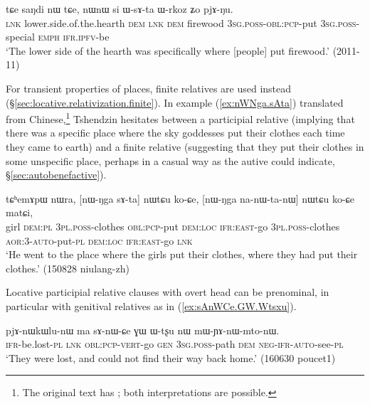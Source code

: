 \begin{exe}
\ex \label{ex:WsAta.Wrkoz}
\gll tɕe saŋdi nɯ tɕe, nɯnɯ si ɯ-sɤ-ta ɯ-rkoz ʑo pjɤ-ŋu. \\
  \textsc{lnk} lower.side.of.the.hearth \textsc{dem} \textsc{lnk} \textsc{dem} firewood \textsc{3sg}.\textsc{poss}-\textsc{obl}:\textsc{pcp}-put \textsc{3sg}.\textsc{poss}-special \textsc{emph} \textsc{ifr}.\textsc{ipfv}-be \\
\glt `The lower side of the hearth was specifically where [people] put firewood.' (2011-11)
\end{exe}


For transient properties of places, finite relatives are used instead (§\ref{sec:locative.relativization.finite}). In example (\ref{ex:nWNga.sAta}) translated from Chinese,\footnote{The original text has ; both interpretations are possible. }  Tshendzin hesitates between a participial relative (implying that there was a specific place where the sky goddesses put their clothes each time they came to earth) and a finite relative (suggesting that they put their clothes in some unspecific place, perhaps in a casual way as the autive  could indicate, §\ref{sec:autobenefactive}).

\begin{exe}
\ex \label{ex:nWNga.sAta}
\gll tɕʰemɤpɯ nɯra, [nɯ-ŋga sɤ-ta] nɯtɕu ko-ɕe, [nɯ-ŋga na-nɯ-ta-nɯ] nɯtɕu ko-ɕe matɕi, \\
girl \textsc{dem}:\textsc{pl} \textsc{3pl}.\textsc{poss}-clothes \textsc{obl}:\textsc{pcp}-put \textsc{dem}:\textsc{loc} \textsc{ifr}:\textsc{east}-go \textsc{3pl}.\textsc{poss}-clothes \textsc{aor}:3\flobv{}-\textsc{auto}-put-\textsc{pl} \textsc{dem}:\textsc{loc} \textsc{ifr}:\textsc{east}-go \textsc{lnk} \\
\glt `He went to the place where the girls put their clothes, where they had put their clothes.' (150828 niulang-zh) 
\end{exe}

Locative participial relative clauses with overt head can be prenominal, in particular with genitival relatives as in (\ref{ex:sAnWCe.GW.Wtsxu}). 

\begin{exe}
\ex \label{ex:sAnWCe.GW.Wtsxu}
\gll  pjɤ-nɯkɯlu-nɯ ma sɤ-nɯ-ɕe ɣɯ ɯ-tʂu nɯ mɯ-ɲɤ-nɯ-mto-nɯ. \\
\textsc{ifr}-be.lost-\textsc{pl}  \textsc{lnk} \textsc{obl}:\textsc{pcp}-\textsc{vert}-go \textsc{gen} \textsc{3sg}.\textsc{poss}-path \textsc{dem} \textsc{neg}-\textsc{ifr}-\textsc{auto}-see-\textsc{pl} \\
\glt `They were lost, and could not find their way back home.' (160630 poucet1) 
\end{exe}

